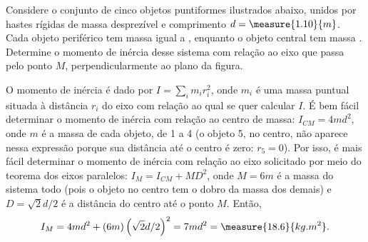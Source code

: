 \begin{question}
	Considere o conjunto de cinco objetos puntiformes ilustrados abaixo, unidos por hastes rígidas de massa desprezível e comprimento $d = \measure{1.10}{m}$.
	Cada objeto periférico tem massa igual a , enquanto o objeto central tem massa .
	Determine o momento de inércia desse sistema com relação ao eixo que passa pelo ponto $M$, perpendicularmente ao plano da figura.


	\begin{answer}
	\end{answer}

	\begin{solution}
		O momento de inércia é dado por $I = \sum_i m_i r_i^2$, onde $m_i$ é uma massa puntual situada à distância $r_i$ do eixo com relação ao qual se quer calcular $I$.
		É bem fácil determinar o momento de inércia com relação ao centro de massa: $I_{CM} = 4md^2$, onde $m$ é a massa de cada objeto, de 1 a 4 (o objeto 5, no centro, não aparece nessa expressão porque sua distância até o centro é zero: $r_5 = 0$).
		Por isso, é mais fácil determinar o momento de inércia com relação ao eixo solicitado por meio do teorema dos eixos paralelos: $I_M = I_{CM} + MD^2$, onde $M = 6m$ é a massa do sistema todo (pois o objeto no centro tem o dobro da massa dos demais) e $D = \sqrt{2}d/2$ é a distância do centro até o ponto $M$.
		Então,
		\begin{equation*}
			I_M = 4md^2 + (6m)\left(\sqrt{2}d/2\right)^2 = 7md^2 = \measure{18.6}{kg.m^2}.
		\end{equation*}
	\end{solution}
\end{question}